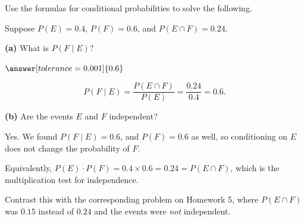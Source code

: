\documentclass[12pt]{ximera}
\begin{document}
\begin{problem}
Use the formulas for conditional probabilities to solve the following.

Suppose $P(E)=0.4$, $P(F)=0.6$, and $P(E\cap F)=0.24$.

\begin{prompt}
\textbf{(a)} What is $P(F\mid E)$?

$\answer[tolerance=0.001]{0.6}$

\begin{feedback}
\[ P(F\mid E)=\frac{P(E\cap F)}{P(E)}=\frac{0.24}{0.4}=0.6. \]
\end{feedback}
\end{prompt}

\begin{prompt}
\textbf{(b)} Are the events $E$ and $F$ independent?

\begin{multipleChoice}
\end{multipleChoice}

\begin{feedback}
Yes. We found $P(F\mid E)=0.6$, and $P(F)=0.6$ as well, so conditioning on $E$ does
not change the probability of $F$.

Equivalently, $P(E)\cdot P(F)=0.4\times 0.6=0.24=P(E\cap F)$, which is the
multiplication test for independence.

Contrast this with the corresponding problem on Homework 5, where $P(E\cap F)$ was
$0.15$ instead of $0.24$ and the events were \emph{not} independent.
\end{feedback}
\end{prompt}
\end{problem}
\end{document}

